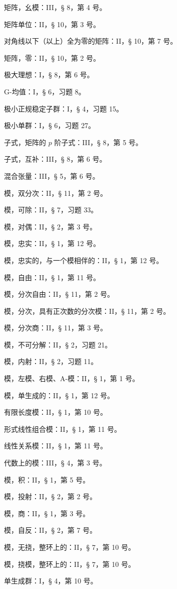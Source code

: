 矩阵，幺模：III，§ 8，第 4 号。

矩阵单位：II，§ 10，第 3 号。

对角线以下（以上）全为零的矩阵：II，§ 10，第 7 号。

矩阵，零：II，§ 10，第 2 号。

极大理想：I，§ 8，第 6 号。

G-均值：I，§ 6，习题 8。

极小正规稳定子群：I，§ 4，习题 15。

极小单群：I，§ 6，习题 27。

子式，矩阵的 \(p\) 阶子式：III，§ 8，第 5 号。

子式，互补：III，§ 8，第 6 号。

混合张量：III，§ 5，第 6 号。

模，双分次：II，§ 11，第 2 号。

模，可除：II，§ 7，习题 33。

模，对偶：II，§ 2，第 3 号。

模，忠实：II，§ 1，第 12 号。

模，忠实的，与一个模相伴的：II，§ 1，第 12 号。

模，自由：II，§ 1，第 11 号。

模，分次自由：II，§ 11，第 2 号。

模，分次，具有正次数的分次模：II，§ 11，第 2 号。

模，分次商：II，§ 11，第 3 号。

模，不可分解：II，§ 2，习题 21。

模，内射：II，§ 2，习题 11。

模，左模、右模、A-模：II，§ 1，第 1 号。

模，单生成的：II，§ 1，第 12 号。

有限长度模：II，§ 1，第 10 号。

形式线性组合模：II，§ 1，第 11 号。

线性关系模：II，§ 1，第 11 号。

代数上的模：III，§ 4，第 3 号。

模，积：II，§ 1，第 5 号。

模，投射：II，§ 2，第 2 号。

模，商：II，§ 1，第 3 号。

模，自反：II，§ 2，第 7 号。

模，无挠，整环上的：II，§ 7，第 10 号。

模，挠模，整环上的：II，§ 7，第 10 号。

单生成群：I，§ 4，第 10 号。


